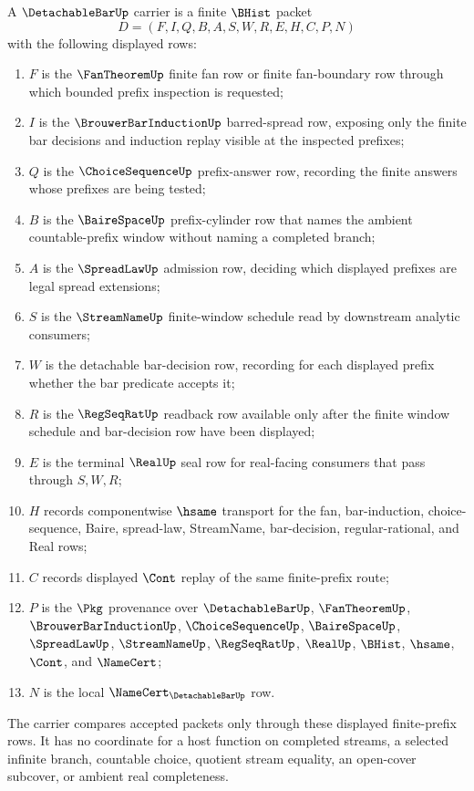\begin{definition}
\label{def:detachable-bar-carrier}
A $\DetachableBarUp$ carrier is a finite $\BHist$ packet
$$
D=(F,I,Q,B,A,S,W,R,E,H,C,P,N)
$$
with the following displayed rows:
\begin{enumerate}
\item $F$ is the $\FanTheoremUp$ finite fan row or finite fan-boundary row through which bounded prefix inspection is requested;
\item $I$ is the $\BrouwerBarInductionUp$ barred-spread row, exposing only the finite bar decisions and induction replay visible at the inspected prefixes;
\item $Q$ is the $\ChoiceSequenceUp$ prefix-answer row, recording the finite answers whose prefixes are being tested;
\item $B$ is the $\BaireSpaceUp$ prefix-cylinder row that names the ambient countable-prefix window without naming a completed branch;
\item $A$ is the $\SpreadLawUp$ admission row, deciding which displayed prefixes are legal spread extensions;
\item $S$ is the $\StreamNameUp$ finite-window schedule read by downstream analytic consumers;
\item $W$ is the detachable bar-decision row, recording for each displayed prefix whether the bar predicate accepts it;
\item $R$ is the $\RegSeqRatUp$ readback row available only after the finite window schedule and bar-decision row have been displayed;
\item $E$ is the terminal $\RealUp$ seal row for real-facing consumers that pass through $S,W,R$;
\item $H$ records componentwise $\hsame$ transport for the fan, bar-induction, choice-sequence, Baire, spread-law, StreamName, bar-decision, regular-rational, and Real rows;
\item $C$ records displayed $\Cont$ replay of the same finite-prefix route;
\item $P$ is the $\Pkg$ provenance over $\DetachableBarUp$, $\FanTheoremUp$, $\BrouwerBarInductionUp$, $\ChoiceSequenceUp$, $\BaireSpaceUp$, $\SpreadLawUp$, $\StreamNameUp$, $\RegSeqRatUp$, $\RealUp$, $\BHist$, $\hsame$, $\Cont$, and $\NameCert$;
\item $N$ is the local $\NameCert_{\DetachableBarUp}$ row.
\end{enumerate}
The carrier compares accepted packets only through these displayed finite-prefix rows. It has no coordinate for a host function on completed streams, a selected infinite branch, countable choice, quotient stream equality, an open-cover subcover, or ambient real completeness.
\end{definition}

